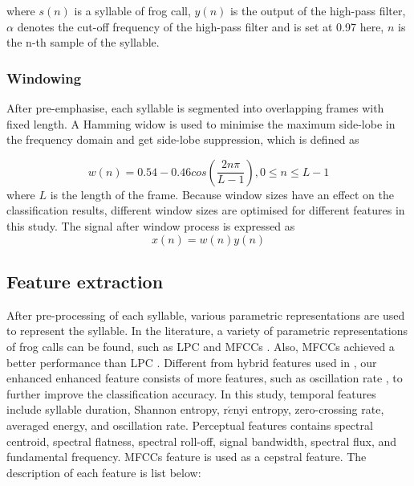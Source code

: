 where $s(n)$ is a syllable of frog call, $y(n)$ is the output of the high-pass filter, $\alpha$ denotes the cut-off frequency of the high-pass filter and is set at 0.97 here, $n$ is the n-th sample of the syllable. 

\subsubsection{Windowing}
After pre-emphasise, each syllable is segmented into overlapping frames with fixed length. A Hamming widow is used to minimise the maximum side-lobe in the frequency domain and get side-lobe suppression, which is defined as

\begin{equation}
w(n)=0.54-0.46cos(\frac{2n\pi}{L-1}), 0 \leq n \leq L-1
\end{equation}
where $L$ is the length of the frame. Because window sizes have an effect on the classification results, different window sizes are optimised for different features in this study. The signal after window process is expressed as
\begin{equation}
x(n) = w(n)y(n)
\end{equation}

\subsection{Feature extraction}
After pre-processing of each syllable, various parametric representations are used to represent the syllable. In the literature, a variety of parametric representations of frog calls can be found, such as LPC and MFCCs \citep{yuan2012frog, jaafar2013automatic, bedoya2014automatic}.
Also, MFCCs achieved a better performance than LPC \citep{yuan2012frog}. Different from hybrid features used in \citep{huang2009frog, han2011acoustic, Gingras2013}, our enhanced enhanced feature consists of more features, such as oscillation rate \citep{Xie1504:Acoustic}, to further improve the classification accuracy. In this study, temporal features include syllable duration, Shannon entropy, r$\acute{e}$nyi entropy, zero-crossing rate, averaged energy, and oscillation rate. Perceptual features contains spectral centroid, spectral flatness, spectral roll-off, signal bandwidth, spectral flux, and fundamental frequency. MFCCs feature is used as a cepstral feature. The description of each feature is list below:

\vspace{3mm}

